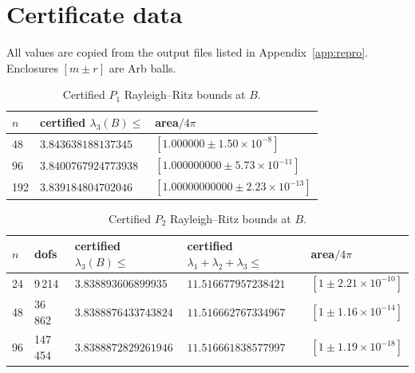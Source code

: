 \documentclass[11pt]{amsart}
\theoremstyle{definition}
\theoremstyle{remark}
\begin{document}
\section{Certificate data}\label{app:data}

All values are copied from the output files listed in Appendix~\ref{app:repro}. Enclosures
$[m\pm r]$ are Arb balls.

\begin{table}[!htbp]
\caption{Trace formula counts (Lemma~\ref{lem:isolation}(a)); $N=21$.}\label{tab:LP}
\small
{}
\end{table}

\begin{table}[!htbp]
\caption{Certified $P_1$ Rayleigh--Ritz bounds at $B$.}\label{tab:P1}
\small
\begin{tabular}{@{}lll@{}}
\toprule
$n$ & certified $\lambda_3(B)\le$ & area$/4\pi$\\
\midrule
48 & $3.843638188137345$ & $[1.000000\pm1.50\times10^{-8}]$\\
96 & $3.8400767924773938$ & $[1.000000000\pm5.73\times10^{-11}]$\\
192 & $3.839184804702046$ & $[1.00000000000\pm2.23\times10^{-13}]$\\
\bottomrule
\end{tabular}
\end{table}

\begin{table}[!htbp]
\caption{Certified $P_2$ Rayleigh--Ritz bounds at $B$.}\label{tab:P2}
\small
\begin{tabular}{@{}lllll@{}}
\toprule
$n$ & dofs & certified $\lambda_3(B)\le$ & certified $\lambda_1+\lambda_2+\lambda_3\le$ & area$/4\pi$\\
\midrule
24 & 9\,214 & $3.838893606899935$ & $11.516677957238421$ & $[1\pm2.21\times10^{-10}]$\\
48 & 36\,862 & $3.8388876433743824$ & $11.516662767334967$ & $[1\pm1.16\times10^{-14}]$\\
96 & 147\,454 & $3.8388872829261946$ & $11.516661838577997$ & $[1\pm1.19\times10^{-18}]$\\
\bottomrule
\end{tabular}
\end{table}
\end{document}
